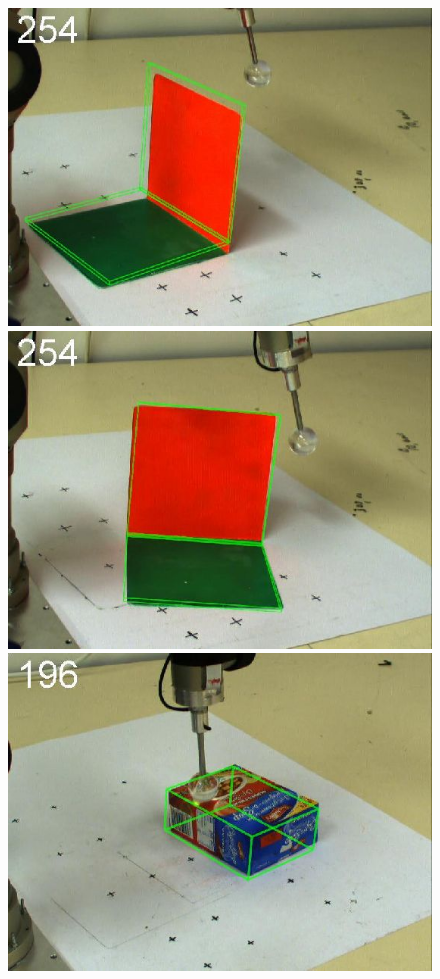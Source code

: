 \begin{figure}[htbp]
{}
\centerline{
\includegraphics[width=\imgAXwid]{./A1_2exp_667_4}
\includegraphics[width=\imgAXwid]{./A1_2exp_876_4}
\includegraphics[width=\imgAXwid]{./A2_2exp_399_4}
}
\end{figure}
